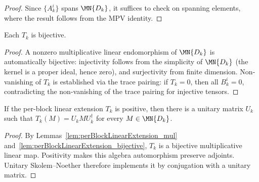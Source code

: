 \begin{proof}\leanok{}
    Since $\{A_k^i\}$ spans $\MN{D_k}$, it suffices to check on spanning
    elements, where the result follows from the MPV identity.
\end{proof}

\begin{lemma}%
    \label{lem:perBlockLinearExtension_bijective}
    \leanok
    Each $T_k$ is bijective.
\end{lemma}

\begin{proof}\leanok{}
    A nonzero multiplicative linear endomorphism of $\MN{D_k}$ is
    automatically bijective: injectivity follows from the simplicity
    of $\MN{D_k}$ (the kernel is a proper ideal, hence zero), and
    surjectivity from finite dimension.
    Non-vanishing of $T_k$ is established via the trace pairing: if
    $T_k = 0$, then all $B_k^i = 0$, contradicting the non-vanishing
    of the trace pairing for injective tensors.
\end{proof}

\begin{lemma}%
    \label{thm:positive_perBlockLinearExtension_unitary}
    \leanok
    If the per-block linear extension $T_k$ is positive, then there is a
    unitary matrix $U_k$ such that
    $T_k(M)=U_kMU_k^\dagger$ for every $M\in\MN{D_k}$.
\end{lemma}

\begin{proof}\leanok
    By Lemmas~\ref{lem:perBlockLinearExtension_mul}
    and~\ref{lem:perBlockLinearExtension_bijective}, $T_k$ is a bijective
    multiplicative linear map. Positivity makes this algebra automorphism
    preserve adjoints. Unitary Skolem--Noether therefore implements it by
    conjugation with a unitary matrix.
\end{proof}

